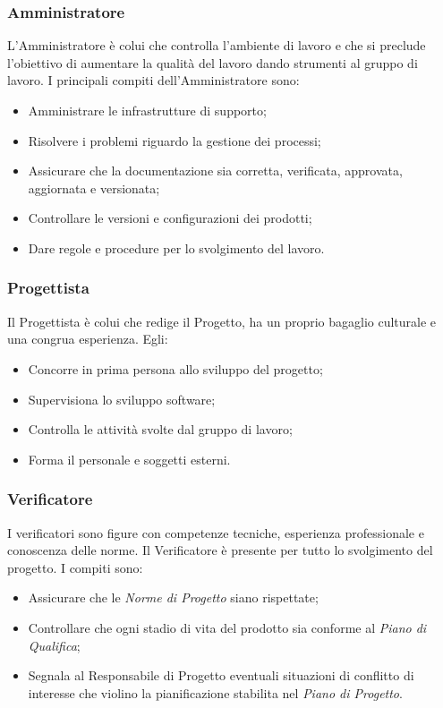                 \subsubsection{Amministratore}
                    L'Amministratore è colui che controlla l'ambiente di lavoro e che si preclude l'obiettivo di aumentare la qualità del lavoro dando strumenti al gruppo di lavoro.
                    I principali compiti dell'Amministratore sono:
                    \begin{itemize}
                        \item Amministrare le infrastrutture di supporto;
                        \item Risolvere i problemi riguardo la gestione dei processi;
                        \item Assicurare che la documentazione sia corretta, verificata, approvata, aggiornata e versionata;
                        \item Controllare le versioni e configurazioni dei prodotti;
                        \item Dare regole e procedure per lo svolgimento del lavoro.
                    \end{itemize}
                \subsubsection{Progettista}
                    Il Progettista è colui che redige il Progetto, ha un proprio bagaglio culturale e una congrua esperienza. Egli:
                    \begin{itemize}
                        \item Concorre in prima persona allo sviluppo del progetto;
                        \item Supervisiona lo sviluppo software;
                        \item Controlla le attività svolte dal gruppo di lavoro;
                        \item Forma il personale e soggetti esterni.
                    \end{itemize}
                \subsubsection{Verificatore}
                    I verificatori sono figure con competenze tecniche, esperienza professionale e conoscenza delle norme. Il Verificatore è presente per tutto lo svolgimento del progetto. I compiti sono:
                    \begin{itemize}
                        \item Assicurare che le \textit{Norme di Progetto} siano rispettate;
                        \item Controllare che ogni stadio di vita del prodotto sia conforme al \textit{Piano di Qualifica};
                        \item Segnala al Responsabile di Progetto eventuali situazioni di conflitto di interesse che violino la pianificazione stabilita nel \textit{Piano di Progetto}.
                    \end{itemize}
